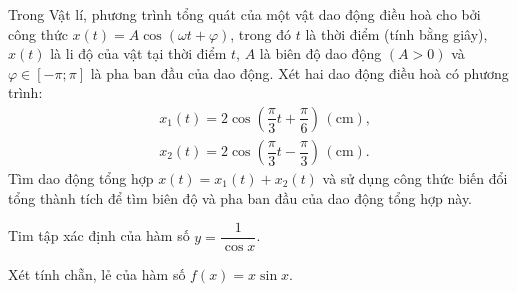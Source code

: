 \begin{bt}%
	Trong Vật lí, phương trình tổng quát của một vật dao động điều hoà cho bởi công thức $x(t)=A \cos (\omega t+\varphi)$, trong đó $t$ là thời điểm (tính bằng giây), $x(t)$ là li độ của vật tại thời điểm $t$, $A$ là biên độ dao động $(A>0)$ và $\varphi \in[-\pi ; \pi]$ là pha ban đầu của dao động. Xét hai dao động điều hoà có phương trình:
	$$
	\begin{aligned}
		& x_1(t)=2 \cos \left(\dfrac{\pi}{3} t+\dfrac{\pi}{6}\right)\,(\mathrm{cm}), \\
		& x_2(t)=2 \cos \left(\dfrac{\pi}{3} t-\dfrac{\pi}{3}\right)\,(\mathrm{cm}) .
	\end{aligned}
	$$
	Tìm dao động tổng hợp $x(t)=x_1(t)+x_2(t)$ và sử dụng công thức biến đổi tổng thành tích để tìm biên độ và pha ban đầu của dao động tổng hợp này.
\end{bt}

\begin{bt}%
Tim tập xác định của hàm số $y=\dfrac{1}{\cos x}$.
\end{bt}

\begin{bt}%
Xét tính chẵn, lẻ của hàm số $f(x)=x \sin x$.
\end{bt}

